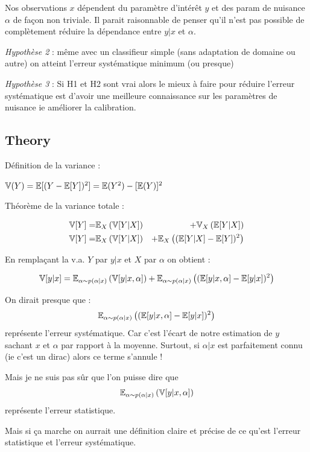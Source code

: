 Nos observations $x$ dépendent du paramètre d'intérêt $y$ et des param de nuisance $\alpha$ de façon non triviale.
Il parait raisonnable de penser qu'il n'est pas possible de complètement réduire la dépendance entre $y|x$ et $\alpha$.

\emph{Hypothèse 2} : même avec un classifieur simple (sans adaptation de domaine ou autre) on atteint l'erreur systématique minimum (ou presque)

\emph{Hypothèse 3} : Si H1 et H2 sont vrai alors le mieux à faire pour réduire l'erreur systématique est d'avoir une meilleure connaissance sur les paramètres de nuisance ie améliorer la calibration.

\subsection{Theory} %
\label{sub:theory}


Définition de la variance :

$\mathbb{V}(Y) = \mathbb{E}[(Y - \mathbb{E}[Y])^2] = \mathbb{E}(Y^2) - [\mathbb{E}(Y)]^2$

Théorème de la variance totale \needcite :

\begin{eqnarray}
    \mathbb{V}[Y] =& \mathbb{E}_X \left (\mathbb{V}[Y|X] \right ) &+ \mathbb{V}_X \left (\mathbb{E}[Y|X]\right ) \\
    \mathbb{V}[Y] =& \mathbb{E}_X \left (\mathbb{V}[Y|X] \right ) &+ \mathbb{E}_X \left ( (\mathbb{E} [Y|X]  - \mathbb{E}[Y])^2\right )
\end{eqnarray}


En remplaçant la v.a. $Y$ par $y|x$ et $X$ par $\alpha$ on obtient :

$$
\mathbb{V}[y|x] = \mathbb{E}_{\alpha \sim p(\alpha|x)} \left (\mathbb{V}[y|x, \alpha] \right ) + \mathbb{E}_{\alpha \sim p(\alpha|x)} \left ( (\mathbb{E} [y|x, \alpha]  - \mathbb{E}[y|x])^2\right )
$$


On dirait presque que : 
$$\mathbb{E}_{\alpha \sim p(\alpha|x)} \left ((\mathbb{E} [y|x, \alpha]  - \mathbb{E}[y|x])^2\right )$$
représente l'erreur systématique. 
Car c'est l'écart de notre estimation de $y$ sachant $x$ et $\alpha$ par rapport à la moyenne.
Surtout, si $\alpha|x$ est parfaitement connu (ie c'est un dirac) alors ce terme s'annule !

Mais je ne suis pas sûr que l'on puisse dire que
$$\mathbb{E}_{\alpha \sim p(\alpha|x)} \left (\mathbb{V}[y|x, \alpha] \right )$$
représente l'erreur statistique.

Mais si ça marche on aurrait une définition claire et précise de ce qu'est l'erreur statistique et l'erreur systématique.



